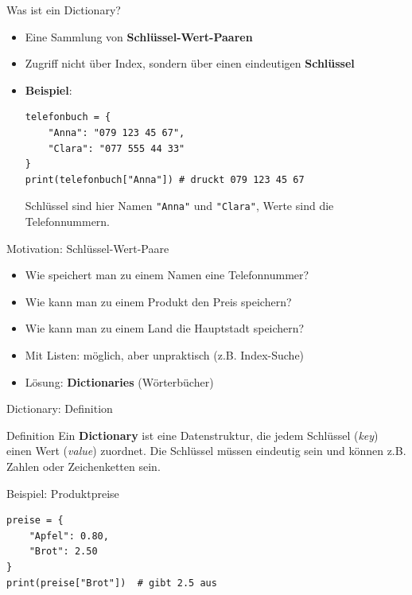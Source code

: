 \begin{frame}[fragile]{Was ist ein Dictionary?}
	\begin{itemize}[<+->]
		\item Eine Sammlung von \textbf{Schlüssel-Wert-Paaren}
		\item Zugriff nicht über Index, sondern über einen eindeutigen \textbf{Schlüssel} 
		\item \textbf{Beispiel}:
		      \begin{lstlisting}
telefonbuch = {
    "Anna": "079 123 45 67",
    "Clara": "077 555 44 33"
}
print(telefonbuch["Anna"]) # druckt 079 123 45 67
	\end{lstlisting}
		      Schlüssel sind hier Namen \lstinline|"Anna"| und \lstinline|"Clara"|, Werte sind die Telefonnummern.
	\end{itemize}

\end{frame}

\begin{frame}{Motivation: Schlüssel-Wert-Paare}
	\begin{itemize}[<+->]
		\item Wie speichert man zu einem Namen eine Telefonnummer?
		\item Wie kann man zu einem Produkt den Preis speichern?
		\item Wie kann man zu einem Land die Hauptstadt speichern?
		\item Mit Listen: möglich, aber unpraktisch (z.B. Index-Suche)
		\item Lösung: \textbf{Dictionaries} (Wörterbücher)
	\end{itemize}
\end{frame}

\begin{frame}[fragile]{Dictionary: Definition}
	\begin{block}{Definition}
		Ein \textbf{Dictionary} ist eine Datenstruktur, die jedem Schlüssel (\textit{key}) einen Wert (\textit{value}) zuordnet. Die Schlüssel müssen eindeutig sein und können z.B. Zahlen oder Zeichenketten sein.
	\end{block}
\end{frame}

\begin{frame}[fragile]{Beispiel: Produktpreise}
	\begin{lstlisting}
preise = {
    "Apfel": 0.80,
    "Brot": 2.50
}
print(preise["Brot"])  # gibt 2.5 aus
	\end{lstlisting}
\end{frame}

